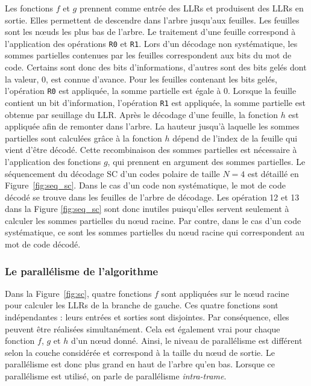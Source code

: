 Les fonctions $f$ et $g$ prennent comme entrée des LLRs et produisent des LLRs en sortie. Elles permettent de descendre dans l'arbre jusqu'aux feuilles. Les feuilles sont les nœuds les plus bas de l'arbre. Le traitement d'une feuille correspond à l'application des opérations \texttt{R0} et \texttt{R1}. Lors d'un décodage non systématique, les sommes partielles contenues par les feuilles correspondent aux bits du mot de code. Certains sont donc des bits d'informations, d'autres sont des bits gelés dont la valeur, $0$, est connue d'avance. Pour les feuilles contenant les bits gelés, l'opération \texttt{R0} est appliquée, la somme partielle est égale à 0. Lorsque la feuille contient un bit d'information, l'opération \texttt{R1} est appliquée, la somme partielle est obtenue par seuillage du LLR. Après le décodage d'une feuille, la fonction $h$ est appliquée afin de remonter dans l'arbre. La hauteur jusqu'à laquelle les sommes partielles sont calculées grâce à la fonction $h$ dépend de l'index de la feuille qui vient d'être décodé. Cette recombinaison des sommes partielles est nécessaire à l'application des fonctions $g$, qui prennent en argument des sommes partielles. Le séquencement du décodage SC d'un codes polaire de taille $N=4$ est détaillé en Figure~\ref{fig:seq_sc}. Dans le cas d'un code non systématique, le mot de code décodé se trouve dans les feuilles de l'arbre de décodage. Les opération 12 et 13 dans la Figure \ref{fig:seq_sc} sont donc inutiles puisqu'elles servent seulement à calculer les sommes partielles du nœud racine. Par contre, dans le cas d'un code systématique, ce sont les sommes partielles du nœud racine qui correspondent au mot de code décodé.

\subsubsection{Le parallélisme de l'algorithme}
Dans la Figure~\ref{fig:sc}, quatre fonctions $f$ sont appliquées sur le nœud racine pour calculer les LLRs de la branche de gauche. Ces quatre fonctions sont indépendantes : leurs entrées et sorties sont disjointes. Par conséquence, elles peuvent être réalisées simultanément. Cela est également vrai pour chaque fonction $f$, $g$ et $h$ d'un nœud donné. Ainsi, le niveau de parallélisme est différent selon la couche considérée et correspond à la taille du nœud de sortie. Le parallélisme est donc plus grand en haut de l'arbre qu'en bas. Lorsque ce parallélisme est utilisé, on parle de parallélisme \textit{intra-trame}.


